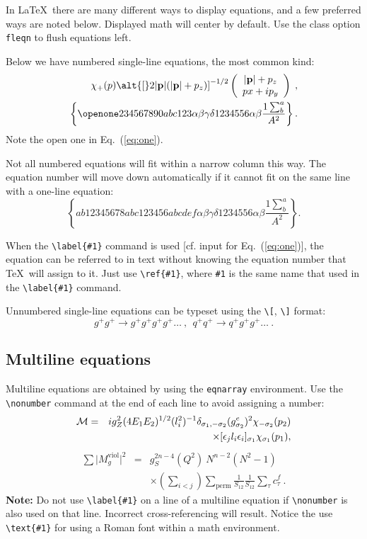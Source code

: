 \documentclass[%
 aip,
 jmp,%
 amsmath,amssymb,
 reprint,%
]{revtex4-1}
\begin{document}
In \LaTeX\ there are many different ways to display equations, and a
few preferred ways are noted below. Displayed math will center by
default. Use the class option \verb+fleqn+ to flush equations left.

Below we have numbered single-line equations, the most common kind: 
\begin{eqnarray}
\chi_+(p)\alt{\bf [}2|{\bf p}|(|{\bf p}|+p_z){\bf ]}^{-1/2}
\left(
\begin{array}{c}
|{\bf p}|+p_z\\
px+ip_y
\end{array}\right)\;,
\\
\left\{%
 \openone234567890abc123\alpha\beta\gamma\delta1234556\alpha\beta
 \frac{1\sum^{a}_{b}}{A^2}%
\right\}%
\label{eq:one}.
\end{eqnarray}
Note the open one in Eq.~(\ref{eq:one}).

Not all numbered equations will fit within a narrow column this
way. The equation number will move down automatically if it cannot fit
on the same line with a one-line equation:
\begin{equation}
\left\{
 ab12345678abc123456abcdef\alpha\beta\gamma\delta1234556\alpha\beta
 \frac{1\sum^{a}_{b}}{A^2}%
\right\}.
\end{equation}

When the \verb+\label{#1}+ command is used [cf. input for
Eq.~(\ref{eq:one})], the equation can be referred to in text without
knowing the equation number that \TeX\ will assign to it. Just
use \verb+\ref{#1}+, where \verb+#1+ is the same name that used in
the \verb+\label{#1}+ command.

Unnumbered single-line equations can be typeset
using the \verb+\[+, \verb+\]+ format:
\[g^+g^+ \rightarrow g^+g^+g^+g^+ \dots ~,~~q^+q^+\rightarrow
q^+g^+g^+ \dots ~. \]

\subsection{Multiline equations}

Multiline equations are obtained by using the \verb+eqnarray+
environment.  Use the \verb+\nonumber+ command at the end of each line
to avoid assigning a number:
\begin{eqnarray}
{\cal M}=&&ig_Z^2(4E_1E_2)^{1/2}(l_i^2)^{-1}
\delta_{\sigma_1,-\sigma_2}
(g_{\sigma_2}^e)^2\chi_{-\sigma_2}(p_2)\nonumber\\
&&\times
[\epsilon_jl_i\epsilon_i]_{\sigma_1}\chi_{\sigma_1}(p_1),
\end{eqnarray}
\begin{eqnarray}
\sum \vert M^{\text{viol}}_g \vert ^2&=&g^{2n-4}_S(Q^2)~N^{n-2}
        (N^2-1)\nonumber \\
 & &\times \left( \sum_{i<j}\right)
  \sum_{\text{perm}}
 \frac{1}{S_{12}}
 \frac{1}{S_{12}}
 \sum_\tau c^f_\tau~.
\end{eqnarray}
\textbf{Note:} Do not use \verb+\label{#1}+ on a line of a multiline
equation if \verb+\nonumber+ is also used on that line. Incorrect
cross-referencing will result. Notice the use \verb+\text{#1}+ for
using a Roman font within a math environment.
\end{document}
